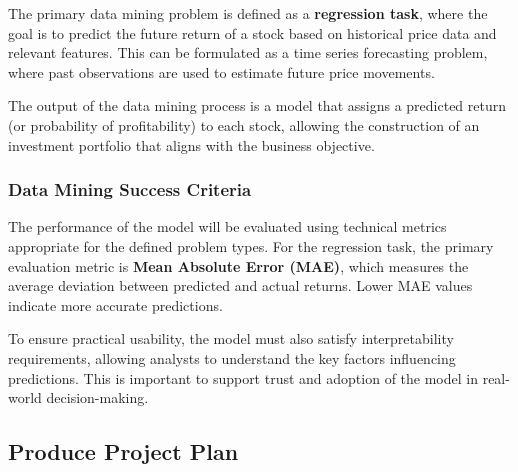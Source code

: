 \documentclass[oneside,final,12pt,a4paper]{extreport}
\begin{document}
The primary data mining problem is defined as a \textbf{regression task}, where the goal is to predict the future return of a stock based on historical price data and relevant features. This can be formulated as a time series forecasting problem, where past observations are used to estimate future price movements.

The output of the data mining process is a model that assigns a predicted return (or probability of profitability) to each stock, allowing the construction of an investment portfolio that aligns with the business objective.

\subsubsection{Data Mining Success Criteria}

The performance of the model will be evaluated using technical metrics appropriate for the defined problem types. For the regression task, the primary evaluation metric is \textbf{Mean Absolute Error (MAE)}, which measures the average deviation between predicted and actual returns. Lower MAE values indicate more accurate predictions.

To ensure practical usability, the model must also satisfy interpretability requirements, allowing analysts to understand the key factors influencing predictions. This is important to support trust and adoption of the model in real-world decision-making.


\subsection{Produce Project Plan}
\end{document}
